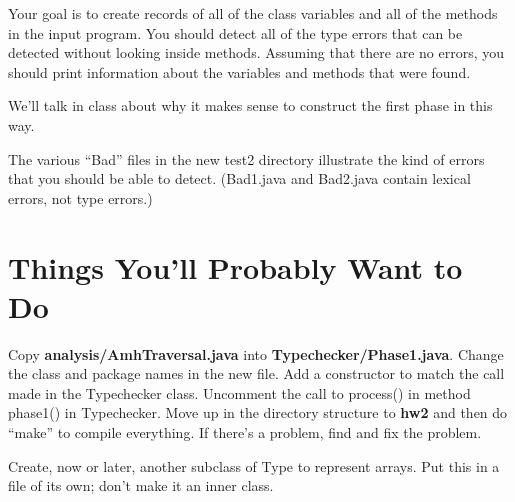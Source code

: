 \documentclass[11pt]{article}
\begin{document}
Your goal is to create records of all of the class variables and all of the methods in the input program.  You should detect all of the type errors that can be detected without looking inside methods.
Assuming that there are no errors, you should print information about the variables and methods that were found.

We'll talk in class about why it makes sense to construct the first phase in this way.

The various ``Bad'' files in the new test2 directory illustrate the kind of errors that you should be able to detect.  (Bad1.java and Bad2.java contain lexical errors, not type errors.)

\section{Things You'll Probably Want to Do}

Copy {\bf analysis/AmhTraversal.java} into {\bf Typechecker/Phase1.java}.  Change the class and package names in the new file.  Add a constructor to match the call made in the Typechecker class.  Uncomment the call to process() in method phase1() in Typechecker.  Move up in the directory structure to {\bf hw2} and then do ``make'' to compile everything.  If there's a problem, find and fix the problem.

Create, now or later, another subclass of Type to represent arrays.  Put this in a file of its own; don't make it an inner class.
\end{document}

